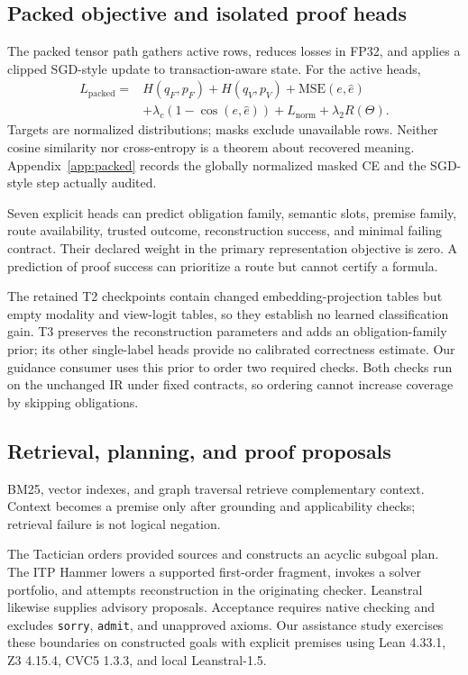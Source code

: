 \documentclass{article}
\begin{document}
\subsection{Packed objective and isolated proof heads}
The packed tensor path gathers active rows, reduces losses in FP32, and applies a clipped SGD-style update to transaction-aware state. For the active heads,
\begin{equation}
\begin{split}
L_{\mathrm{packed}}={}&H(q_F,p_F)+H(q_V,p_V)+\mathrm{MSE}(e,\hat e)\\
&+\lambda_c(1-\cos(e,\hat e))+L_{\mathrm{norm}}+\lambda_2 R(\Theta).
\end{split}
\label{eq:packed}
\end{equation}
Targets are normalized distributions; masks exclude unavailable rows. Neither cosine similarity nor cross-entropy is a theorem about recovered meaning. Appendix~\ref{app:packed} records the globally normalized masked CE and the SGD-style step actually audited.

Seven explicit heads can predict obligation family, semantic slots, premise family, route availability, trusted outcome, reconstruction success, and minimal failing contract. Their declared weight in the primary representation objective is zero. A prediction of proof success can prioritize a route but cannot certify a formula.

The retained T2 checkpoints contain changed embedding-projection tables but empty modality and view-logit tables, so they establish no learned classification gain. T3 preserves the reconstruction parameters and adds an obligation-family prior; its other single-label heads provide no calibrated correctness estimate. Our guidance consumer uses this prior to order two required checks. Both checks run on the unchanged IR under fixed contracts, so ordering cannot increase coverage by skipping obligations.

\subsection{Retrieval, planning, and proof proposals}
BM25, vector indexes, and graph traversal retrieve complementary context. Context becomes a premise only after grounding and applicability checks; retrieval failure is not logical negation.

The Tactician orders provided sources and constructs an acyclic subgoal plan. The ITP Hammer lowers a supported first-order fragment, invokes a solver portfolio, and attempts reconstruction in the originating checker. Leanstral likewise supplies advisory proposals. Acceptance requires native checking and excludes \texttt{sorry}, \texttt{admit}, and unapproved axioms. Our assistance study exercises these boundaries on constructed goals with explicit premises using Lean 4.33.1, Z3 4.15.4, CVC5 1.3.3, and local Leanstral-1.5.
\end{document}
